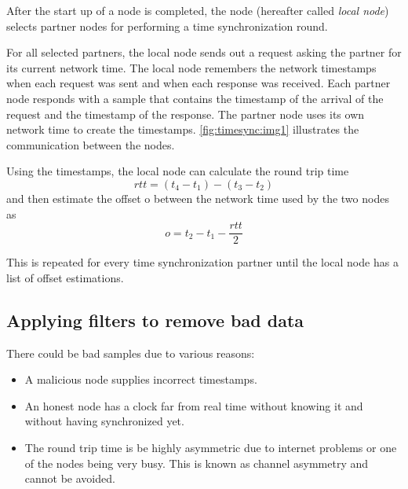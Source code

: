 After the start up of a node is completed, the node (hereafter called \emph{local node}) selects partner nodes for performing a time synchronization round.

For all selected partners, the local node sends out a request asking the partner for its current network time.
The local node remembers the network timestamps when each request was sent and when each response was received.
Each partner node responds with a sample that contains the timestamp of the arrival of the request and the timestamp of the response.
The partner node uses its own network time to create the timestamps.
\autoref{fig:timesync:img1} illustrates the communication between the nodes.

\begin{figure}
\end{figure}

Using the timestamps, the local node can calculate the round trip time
$$\mathit{rtt}=(t_4 - t_1) - (t_3 - t_2)$$
and then estimate the offset o between the network time used by the two nodes as
$$o = t_2 - t_1 - \frac{\mathit{rtt}}{2}$$

This is repeated for every time synchronization partner until the local node has a list of offset estimations.

\subsection{Applying filters to remove bad data}

There could be bad samples due to various reasons:
\begin{itemize}
\item A malicious node supplies incorrect timestamps.
\item An honest node has a clock far from real time without knowing it and without having synchronized yet.
\item The round trip time is be highly asymmetric due to internet problems or one of the nodes being very busy.
This is known as channel asymmetry and cannot be avoided.
\end{itemize}

